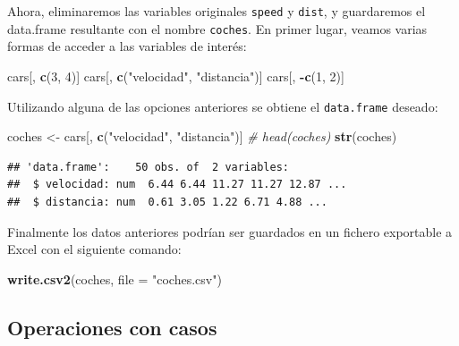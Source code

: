 \documentclass[]{book}
\newenvironment{Shaded}{\begin{snugshade}}{\end{snugshade}}
\newcommand{\CommentTok}[1]{\textcolor[rgb]{0.56,0.35,0.01}{\textit{#1}}}
\newcommand{\DataTypeTok}[1]{\textcolor[rgb]{0.13,0.29,0.53}{#1}}
\newcommand{\DecValTok}[1]{\textcolor[rgb]{0.00,0.00,0.81}{#1}}
\newcommand{\KeywordTok}[1]{\textcolor[rgb]{0.13,0.29,0.53}{\textbf{#1}}}
\newcommand{\NormalTok}[1]{#1}
\newcommand{\OperatorTok}[1]{\textcolor[rgb]{0.81,0.36,0.00}{\textbf{#1}}}
\newcommand{\StringTok}[1]{\textcolor[rgb]{0.31,0.60,0.02}{#1}}
\begin{document}
Ahora, eliminaremos las variables originales \texttt{speed} y
\texttt{dist}, y guardaremos el data.frame resultante con el nombre \texttt{coches}.
En primer lugar, veamos varias formas de acceder a las variables de
interés:

\begin{Shaded}
\begin{Highlighting}[]
\NormalTok{cars[, }\KeywordTok{c}\NormalTok{(}\DecValTok{3}\NormalTok{, }\DecValTok{4}\NormalTok{)]}
\NormalTok{cars[, }\KeywordTok{c}\NormalTok{(}\StringTok{"velocidad"}\NormalTok{, }\StringTok{"distancia"}\NormalTok{)]}
\NormalTok{cars[, }\OperatorTok{-}\KeywordTok{c}\NormalTok{(}\DecValTok{1}\NormalTok{, }\DecValTok{2}\NormalTok{)]}
\end{Highlighting}
\end{Shaded}

Utilizando alguna de las opciones anteriores se obtiene el \texttt{data.frame}
deseado:

\begin{Shaded}
\begin{Highlighting}[]
\NormalTok{coches <-}\StringTok{ }\NormalTok{cars[, }\KeywordTok{c}\NormalTok{(}\StringTok{"velocidad"}\NormalTok{, }\StringTok{"distancia"}\NormalTok{)]}
\CommentTok{# head(coches)}
\KeywordTok{str}\NormalTok{(coches)}
\end{Highlighting}
\end{Shaded}

\begin{verbatim}
## 'data.frame':    50 obs. of  2 variables:
##  $ velocidad: num  6.44 6.44 11.27 11.27 12.87 ...
##  $ distancia: num  0.61 3.05 1.22 6.71 4.88 ...
\end{verbatim}

Finalmente los datos anteriores podrían ser guardados en un fichero
exportable a Excel con el siguiente comando:

\begin{Shaded}
\begin{Highlighting}[]
\KeywordTok{write.csv2}\NormalTok{(coches, }\DataTypeTok{file =} \StringTok{"coches.csv"}\NormalTok{)}
\end{Highlighting}
\end{Shaded}

\hypertarget{operaciones-con-casos}{%
\subsection{Operaciones con casos}\label{operaciones-con-casos}}
\end{document}
